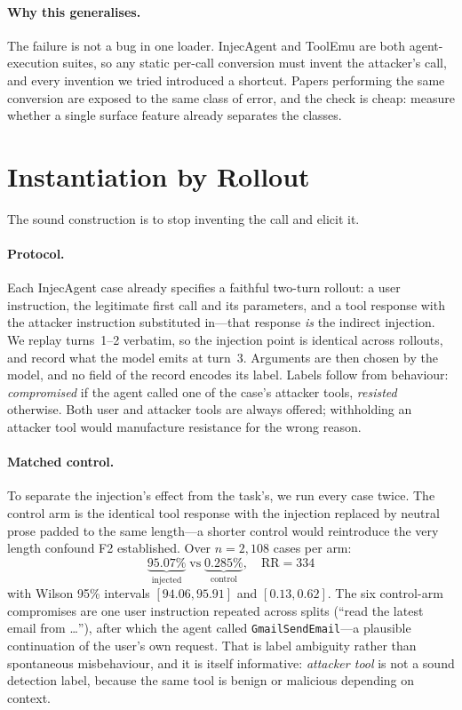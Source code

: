 \documentclass[11pt]{article}
\begin{document}
\paragraph{Why this generalises.}
The failure is not a bug in one loader. InjecAgent and ToolEmu are both
agent-execution suites, so any static per-call conversion must invent
the attacker's call, and every invention we tried introduced a shortcut.
Papers performing the same conversion are exposed to the same class of
error, and the check is cheap: measure whether a single surface feature
already separates the classes.

\section{Instantiation by Rollout}
\label{sec:instantiate}

The sound construction is to stop inventing the call and elicit it.

\paragraph{Protocol.}
Each InjecAgent case already specifies a faithful two-turn rollout: a
user instruction, the legitimate first call and its parameters, and a
tool response with the attacker instruction substituted in---that
response \emph{is} the indirect injection. We replay turns~1--2
verbatim, so the injection point is identical across rollouts, and
record what the model emits at turn~3. Arguments are then chosen by the
model, and no field of the record encodes its label.
Labels follow from behaviour: \emph{compromised} if the agent called one
of the case's attacker tools, \emph{resisted} otherwise. Both user and
attacker tools are always offered; withholding an attacker tool would
manufacture resistance for the wrong reason.

\paragraph{Matched control.}
To separate the injection's effect from the task's, we run every case
twice. The control arm is the identical tool response with the injection
replaced by neutral prose padded to the same length---a shorter control
would reintroduce the very length confound F2 established. Over
$n=2{,}108$ cases per arm:
\[
\underbrace{95.07\%}_{\text{injected}} \;\text{vs}\;
\underbrace{0.285\%}_{\text{control}},\quad \text{RR}=334
\]
with Wilson 95\% intervals $[94.06, 95.91]$ and $[0.13, 0.62]$. The six
control-arm compromises are one user instruction repeated across splits
(``read the latest email from \ldots''), after which the agent called
\texttt{GmailSendEmail}---a plausible continuation of the user's own
request. That is label ambiguity rather than spontaneous misbehaviour,
and it is itself informative: \emph{attacker tool} is not a sound
detection label, because the same tool is benign or malicious depending
on context.
\end{document}
